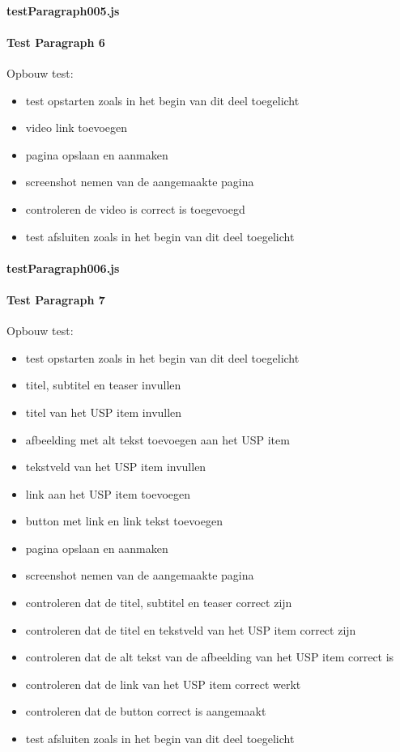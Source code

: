 \paragraph{testParagraph005.js}


\clearpage
\paragraph{Test Paragraph 6}
\label{test6}
Opbouw test: 
\begin{itemize}
\item test opstarten zoals in het begin van dit deel toegelicht
\item video link toevoegen
\item pagina opslaan en aanmaken
\item screenshot nemen van de aangemaakte pagina
\item controleren de video is correct is toegevoegd
\item test afsluiten zoals in het begin van dit deel toegelicht
\end{itemize}
\paragraph{testParagraph006.js}


\clearpage
\paragraph{Test Paragraph 7}
\label{test7}
Opbouw test: 
\begin{itemize}
\item test opstarten zoals in het begin van dit deel toegelicht
\item titel, subtitel en teaser invullen
\item titel van het USP item invullen
\item afbeelding met alt tekst toevoegen aan het USP item
\item tekstveld van het USP item invullen
\item link aan het USP item toevoegen
\item button met link en link tekst toevoegen
\item pagina opslaan en aanmaken
\item screenshot nemen van de aangemaakte pagina
\item controleren dat de titel, subtitel en teaser correct zijn
\item controleren dat de titel en tekstveld van het USP item correct zijn
\item controleren dat de alt tekst van de afbeelding van het USP item correct is
\item controleren dat de link van het USP item correct werkt
\item controleren dat de button correct is aangemaakt
\item test afsluiten zoals in het begin van dit deel toegelicht
\end{itemize}
